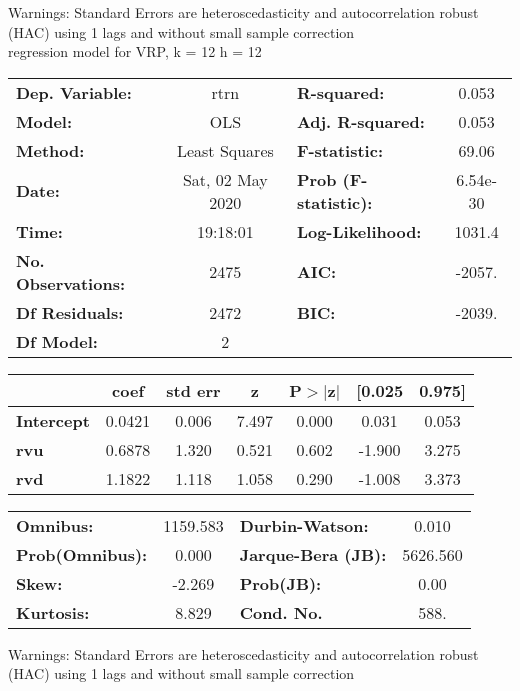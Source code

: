 Warnings: \newline
 [1] Standard Errors are heteroscedasticity and autocorrelation robust (HAC) using 1 lags and without small sample correction\\ 

regression model for VRP, k = 12 h = 12\begin{center}
\begin{tabular}{lclc}
\toprule
\textbf{Dep. Variable:}    &       rtrn       & \textbf{  R-squared:         } &     0.053   \\
\textbf{Model:}            &       OLS        & \textbf{  Adj. R-squared:    } &     0.053   \\
\textbf{Method:}           &  Least Squares   & \textbf{  F-statistic:       } &     69.06   \\
\textbf{Date:}             & Sat, 02 May 2020 & \textbf{  Prob (F-statistic):} &  6.54e-30   \\
\textbf{Time:}             &     19:18:01     & \textbf{  Log-Likelihood:    } &    1031.4   \\
\textbf{No. Observations:} &        2475      & \textbf{  AIC:               } &    -2057.   \\
\textbf{Df Residuals:}     &        2472      & \textbf{  BIC:               } &    -2039.   \\
\textbf{Df Model:}         &           2      & \textbf{                     } &             \\
\bottomrule
\end{tabular}
\begin{tabular}{lcccccc}
                   & \textbf{coef} & \textbf{std err} & \textbf{z} & \textbf{P$> |$z$|$} & \textbf{[0.025} & \textbf{0.975]}  \\
\midrule
\textbf{Intercept} &       0.0421  &        0.006     &     7.497  &         0.000        &        0.031    &        0.053     \\
\textbf{rvu}       &       0.6878  &        1.320     &     0.521  &         0.602        &       -1.900    &        3.275     \\
\textbf{rvd}       &       1.1822  &        1.118     &     1.058  &         0.290        &       -1.008    &        3.373     \\
\bottomrule
\end{tabular}
\begin{tabular}{lclc}
\textbf{Omnibus:}       & 1159.583 & \textbf{  Durbin-Watson:     } &    0.010  \\
\textbf{Prob(Omnibus):} &   0.000  & \textbf{  Jarque-Bera (JB):  } & 5626.560  \\
\textbf{Skew:}          &  -2.269  & \textbf{  Prob(JB):          } &     0.00  \\
\textbf{Kurtosis:}      &   8.829  & \textbf{  Cond. No.          } &     588.  \\
\bottomrule
\end{tabular}
\end{center}

Warnings: \newline
 [1] Standard Errors are heteroscedasticity and autocorrelation robust (HAC) using 1 lags and without small sample correction\\ 

